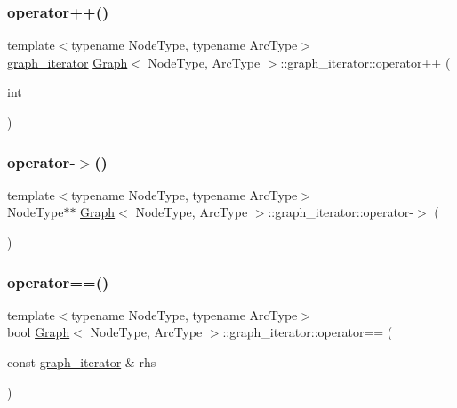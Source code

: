 \subsubsection{\texorpdfstring{operator++()}{operator++()}\hspace{0.1cm}{\footnotesize\ttfamily [2/2]}}
{\footnotesize\ttfamily template$<$typename Node\+Type, typename Arc\+Type$>$ \\
\mbox{\hyperlink{classGraph_1_1graph__iterator}{graph\+\_\+iterator}} \mbox{\hyperlink{classGraph}{Graph}}$<$ Node\+Type, Arc\+Type $>$\+::graph\+\_\+iterator\+::operator++ (\begin{DoxyParamCaption}\item[{int}]{ }\end{DoxyParamCaption})\hspace{0.3cm}{\ttfamily [inline]}}

\mbox{\label{classGraph_1_1graph__iterator_aba0a581abc84f3dd8dccb2bc5842628d}} 
\subsubsection{\texorpdfstring{operator-\/$>$()}{operator->()}}
{\footnotesize\ttfamily template$<$typename Node\+Type, typename Arc\+Type$>$ \\
Node\+Type$\ast$$\ast$ \mbox{\hyperlink{classGraph}{Graph}}$<$ Node\+Type, Arc\+Type $>$\+::graph\+\_\+iterator\+::operator-\/$>$ (\begin{DoxyParamCaption}{ }\end{DoxyParamCaption})\hspace{0.3cm}{\ttfamily [inline]}}

\mbox{\label{classGraph_1_1graph__iterator_ad3519806dff27934c5f07b749b0ac17a}} 
\subsubsection{\texorpdfstring{operator==()}{operator==()}}
{\footnotesize\ttfamily template$<$typename Node\+Type, typename Arc\+Type$>$ \\
bool \mbox{\hyperlink{classGraph}{Graph}}$<$ Node\+Type, Arc\+Type $>$\+::graph\+\_\+iterator\+::operator== (\begin{DoxyParamCaption}\item[{const \mbox{\hyperlink{classGraph_1_1graph__iterator}{graph\+\_\+iterator}} \&}]{rhs }\end{DoxyParamCaption})\hspace{0.3cm}{\ttfamily [inline]}}




